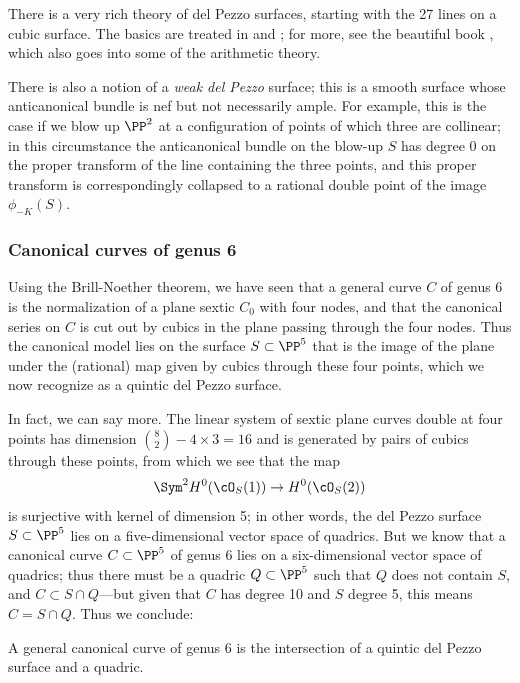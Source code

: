 There is a very rich theory of del Pezzo surfaces, starting with the 27 lines on a cubic surface. The basics are treated in \cite{Beauville} and \cite{Griffiths-Harris}; for more, see the
beautiful book \cite{Manin}, which also goes into some of the arithmetic theory.

There is also a notion of a \emph{weak del Pezzo} surface; this is a smooth surface whose anticanonical bundle is nef but not necessarily ample. For example, this is the case if we blow up $\PP^2$ at a configuration of points of which three are collinear; in this circumstance the anticanonical bundle on the blow-up $S$ has degree 0 on the proper transform of the line containing the three points, and this proper transform is correspondingly collapsed to a rational double point of the image $\phi_{-K}(S)$. 

\subsubsection{Canonical curves of genus 6}

Using the Brill-Noether theorem, we have seen that a general curve $C$ of genus 6 is the normalization of a plane sextic $C_0$ with four nodes, and that the canonical series on $C$ is cut out by cubics in the plane passing through the four nodes. Thus the canonical model lies on the surface $S \subset \PP^5$ that is the image of the plane under the (rational) map given by cubics through these four points, which we now recognize as a quintic del Pezzo surface.

In fact, we can say more. The linear system of sextic plane curves double at four points has dimension $\binom{8}{2} - 4\times 3 = 16$ and is generated by pairs of cubics through these points, from which we see that the map
$$
\Sym^2 H^0(\cO_S(1)) \to H^0(\cO_S(2))
$$
is surjective with kernel of dimension 5; in other words, the del Pezzo surface $S \subset \PP^5$ lies on a five-dimensional vector space of quadrics. But we know that a canonical curve $C \subset \PP^5$ of genus 6 lies on a six-dimensional vector space of quadrics; thus there must be a quadric $Q \subset \PP^5$ such that $Q$ does not contain $S$, and $C \subset S \cap Q$---but given that $C$ has degree 10 and $S$ degree 5, this means $C = S \cap Q$. Thus we conclude:

\begin{theorem}
A general canonical curve of genus 6 is the intersection of a quintic del Pezzo surface and a quadric. 
\end{theorem}



